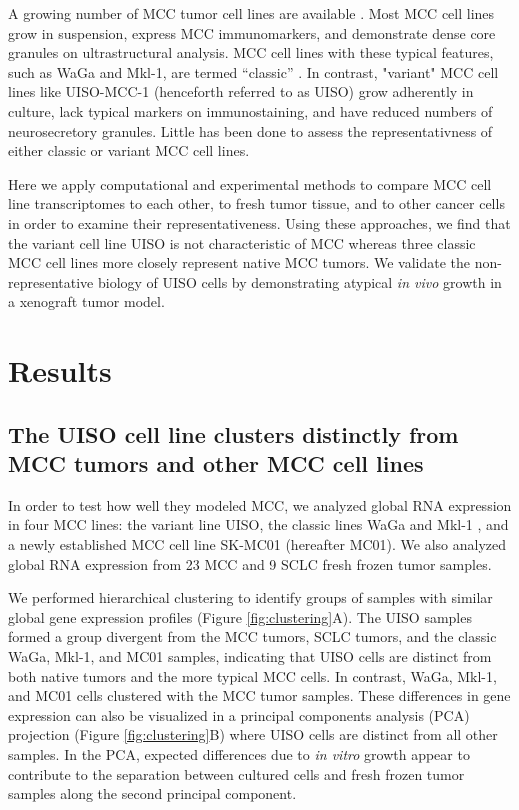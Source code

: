 \documentclass[10pt]{article}
\begin{document}
A growing number of MCC tumor cell lines are available \citep{Krasagakis2001Growth,Leonard1993Characterization,Rosen1987Establishment,Leonard1995Characterisation,Moll1994Establishment,Ronan1993Merkel}.
Most MCC cell lines grow in suspension, express MCC immunomarkers, and demonstrate dense core granules on ultrastructural analysis.
MCC cell lines with these typical features, such as WaGa and Mkl-1, are termed ``classic'' \citep{Ronan1993Merkel,Leonard1993Characterization,VanGele2004Geneexpression}.
In contrast, "variant" MCC cell lines like UISO-MCC-1 (henceforth referred to as UISO) \citep{Ronan1993Merkel} grow adherently in culture, lack typical markers on immunostaining, and have reduced numbers of neurosecretory granules.
Little has been done to assess the representativness of either classic or variant MCC cell lines. 

Here we apply computational and experimental methods to compare MCC cell line transcriptomes to each other, to fresh tumor tissue, and to other cancer cells in order to examine their representativeness.
Using these approaches, we find that the variant cell line UISO is not characteristic of MCC whereas three classic MCC cell lines more closely represent native MCC tumors. 
We validate the non-representative biology of UISO cells by demonstrating atypical \emph{in vivo} growth in a xenograft tumor model. 

\section*{Results}

\subsection*{The UISO cell line clusters distinctly from MCC tumors and other MCC cell lines}
In order to test how well they modeled MCC, we analyzed global RNA expression in four MCC lines: the variant line UISO, the classic lines WaGa \citep{Houben2010Merkel} and Mkl-1 \citep{Rosen1987Establishment}, and a newly established MCC cell line SK-MC01 (hereafter MC01).
We also analyzed global RNA expression from 23 MCC and 9 SCLC fresh frozen tumor samples.

 We performed hierarchical clustering to identify groups of samples with similar global gene expression profiles (Figure \ref{fig:clustering}A).
The UISO samples formed a group divergent from the MCC tumors, SCLC tumors, and the classic WaGa, Mkl-1, and MC01 samples, indicating that UISO cells are distinct from both native tumors and the more typical MCC cells.
In contrast, WaGa, Mkl-1, and MC01 cells clustered with the MCC tumor samples.
These differences in gene expression can also be visualized in a principal components analysis (PCA) projection (Figure \ref{fig:clustering}B) where UISO cells are distinct from all other samples.
In the PCA, expected differences due to \emph{in vitro} growth appear to contribute to the separation between cultured cells and fresh frozen tumor samples along the second principal component.
\end{document}
